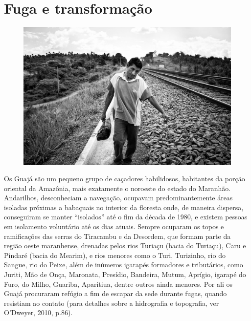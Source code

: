 
\chapter{Fuga e transformação}\label{fuga-e-transformauxe7uxe3o}

\begin{figure}[H]
\centering
  \includegraphics[width=\textwidth]{./imgs/Irakatakoa_426}
\end{figure}

\noindent Os Guajá são um pequeno grupo de caçadores habilidosos, habitantes da
porção oriental da Amazônia, mais exatamente o noroeste do estado do
Maranhão. Andarilhos, desconheciam a navegação, ocupavam
predominantemente áreas isoladas próximas a babaçuais no interior da
floresta onde, de maneira dispersa, conseguiram se manter ``isolados''
até o fim da década de 1980, e existem pessoas em isolamento voluntário
até os dias atuais. Sempre ocuparam os topos e ramificações das serras
do Tiracambu e da Desordem, que formam parte da região oeste maranhense,
drenadas pelos rios Turiaçu (bacia do Turiaçu), Caru e Pindaré (bacia do
Mearim), e rios menores como o Turi, Turizinho, rio do Sangue, rio do
Peixe, além de inúmeros igarapés formadores e tributários, como Juriti,
Mão de Onça, Maronata, Presídio, Bandeira, Mutum, Aprígio, igarapé do
Furo, do Milho, Guariba, Aparitiua, dentre outros ainda menores. Por ali
os Guajá procuraram refúgio a fim de escapar da sede durante fugas,
quando resistiam ao contato (para detalhes sobre a hidrografia e
topografia, ver O'Dweyer, 2010, p.86).

